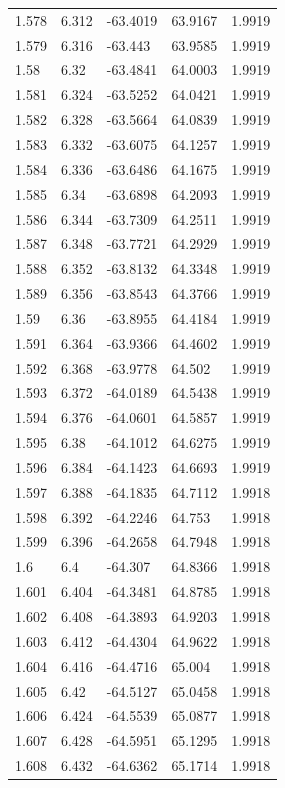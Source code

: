 \begin{tabular}{lllll}
1.578 & 6.312 & -63.4019 & 63.9167 & 1.9919 \\
1.579 & 6.316 & -63.443 & 63.9585 & 1.9919 \\
1.58 & 6.32 & -63.4841 & 64.0003 & 1.9919 \\
1.581 & 6.324 & -63.5252 & 64.0421 & 1.9919 \\
1.582 & 6.328 & -63.5664 & 64.0839 & 1.9919 \\
1.583 & 6.332 & -63.6075 & 64.1257 & 1.9919 \\
1.584 & 6.336 & -63.6486 & 64.1675 & 1.9919 \\
1.585 & 6.34 & -63.6898 & 64.2093 & 1.9919 \\
1.586 & 6.344 & -63.7309 & 64.2511 & 1.9919 \\
1.587 & 6.348 & -63.7721 & 64.2929 & 1.9919 \\
1.588 & 6.352 & -63.8132 & 64.3348 & 1.9919 \\
1.589 & 6.356 & -63.8543 & 64.3766 & 1.9919 \\
1.59 & 6.36 & -63.8955 & 64.4184 & 1.9919 \\
1.591 & 6.364 & -63.9366 & 64.4602 & 1.9919 \\
1.592 & 6.368 & -63.9778 & 64.502 & 1.9919 \\
1.593 & 6.372 & -64.0189 & 64.5438 & 1.9919 \\
1.594 & 6.376 & -64.0601 & 64.5857 & 1.9919 \\
1.595 & 6.38 & -64.1012 & 64.6275 & 1.9919 \\
1.596 & 6.384 & -64.1423 & 64.6693 & 1.9919 \\
1.597 & 6.388 & -64.1835 & 64.7112 & 1.9918 \\
1.598 & 6.392 & -64.2246 & 64.753 & 1.9918 \\
1.599 & 6.396 & -64.2658 & 64.7948 & 1.9918 \\
1.6 & 6.4 & -64.307 & 64.8366 & 1.9918 \\
1.601 & 6.404 & -64.3481 & 64.8785 & 1.9918 \\
1.602 & 6.408 & -64.3893 & 64.9203 & 1.9918 \\
1.603 & 6.412 & -64.4304 & 64.9622 & 1.9918 \\
1.604 & 6.416 & -64.4716 & 65.004 & 1.9918 \\
1.605 & 6.42 & -64.5127 & 65.0458 & 1.9918 \\
1.606 & 6.424 & -64.5539 & 65.0877 & 1.9918 \\
1.607 & 6.428 & -64.5951 & 65.1295 & 1.9918 \\
1.608 & 6.432 & -64.6362 & 65.1714 & 1.9918 \\

\end{tabular}

